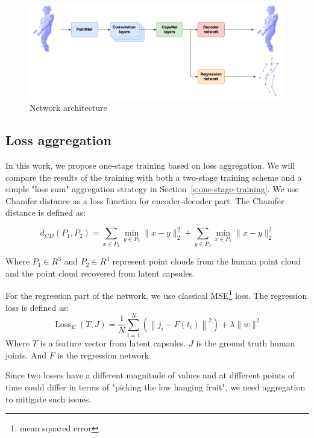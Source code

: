 \begin{figure}[htbp]
    \centerline{\includegraphics[scale=.125]{Figures/network architecture.png}}
    \caption{Network architecture}
    \label{img:network-architecture}
\end{figure}

\subsection{Loss aggregation}
In this work, we propose one-stage training based on loss aggregation. 
We will compare the results of the training with both a two-stage training scheme and a simple "loss sum" aggregation strategy in Section~\ref{s:one-stage-training}.
We use Chamfer distance as a loss function for encoder-decoder part. The Chamfer distance is defined as:

\begin{equation}
d_{C D}\left(P_{1}, P_{2}\right)=\sum_{x \in P_{1}} \min _{y \in P_{2}}\|x-y\|_{2}^{2}+\sum_{y \in P_{2}} \min _{x \in P_{1}}\|x-y\|_{2}^{2}
\label{eqn:chamfer-distance}
\end{equation}

Where $P_1 \in R^3$ and $P_2 \in R^3$ represent point clouds from the human point cloud and the point cloud recovered from latent capsules.

For the regression part of the network, we use classical MSE\footnote{mean squared error} loss.
The regression loss is defined as:
\begin{equation}
    \operatorname{Loss}_{E}(T, J)=\frac{1}{N} \sum_{i=1}^{N}\left(\left\|j_{i}-F\left(t_{i}\right)\right\|^{2}\right)+\lambda\|w\|^{2}
\label{eqn:regression-loss}
\end{equation}
Where $T$ is a feature vector from latent capsules. $J$ is the ground truth human joints. And $F$ is the regression network.

Since two losses have a different magnitude of values and at different points of time could differ in terms of "picking the low hanging fruit", we need aggregation to mitigate such issues.

